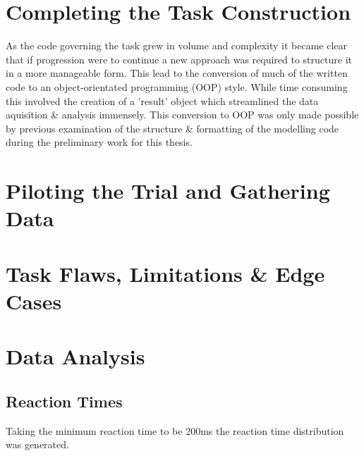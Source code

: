 \section{Completing the Task Construction}
As the code governing the task grew in volume and complexity it became clear that if progression were to continue a new approach was required to structure it in a more manageable form. This lead to the conversion of much of the written code to an object-orientated programming (OOP) style. While time consuming this involved the creation of a 'result' object which streamlined the data aquisition \& analysis immensely. This conversion to OOP was only made possible by previous examination of the structure \& formatting of the modelling code during the preliminary work for this thesis.


\section{Piloting the Trial and Gathering Data}

\section{Task Flaws, Limitations \& Edge Cases}

\section{Data Analysis}
\subsection{Reaction Times}
Taking the minimum reaction time to be 200ms the reaction time distribution was generated. \citep{jainComparativeStudyVisual2015}
